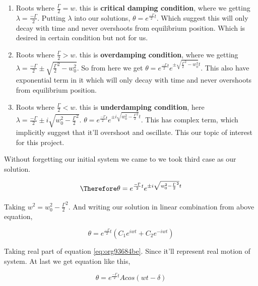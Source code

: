 \documentclass[11pt,a4paper]{article}
\begin{document}
\begin{enumerate}
\item Roots where \(\frac{\Gamma}{2}=w\). this is \textbf{critical damping condition}, where we getting \(\lambda=\frac{-\Gamma}{2}\). Putting \(\lambda\) into our solutions, \(\theta = e^{\frac{-\Gamma}{2}t}\). Which suggest this will only decay with time and never overshoots from equilibrium position. Which is desired in certain condition but not for us.

\item Roots where \(\frac{\Gamma}{2}>w\). this is \textbf{overdamping condition}, where we getting \(\lambda=\frac{-\Gamma}{2}\pm\sqrt{\frac{\Gamma}{2}^{2}-w_{0}^{2}}\). So from here we get \(\theta = e^{\frac{-\Gamma}{2}t}e^{\pm\sqrt{\frac{\Gamma}{2}^{2}-w_{0}^{2}}t}\). This also have exponential term in it which will only decay with time and never overshoots from equilibrium position.

\item Roots where \(\frac{\Gamma}{2}<w\). this is \textbf{underdamping condition}, here  \(\lambda=\frac{-\Gamma}{2}\pm i\sqrt{w_{0}^{2}-\frac{\Gamma}{2}^{2}}\). \(\theta = e^{\frac{-\Gamma}{2}t}e^{\pm i \sqrt{w_{0}^{2}-\frac{\Gamma}{2}^{2}}t}\). This has complex term, which implicitly suggest that it'll overshoot and oscillate. This our topic of interest for this project.
\end{enumerate}


Without forgetting our initial system we came to we took third case as our solution.

\begin{equation*}
\label{eq:org1eea347}
\Therefore \theta = e^{\frac{-\Gamma}{2}t}e^{\pm i \sqrt{w_{0}^{2}-\frac{\Gamma}{2}^{2}}t}
\end{equation*}

Taking \(w^{2} = w_{0}^{2}-\frac{\Gamma}{2}^{2}\). And writing our solution in linear combination from above equation,

\begin{equation}
\label{eq:org93684be}
\theta = e^{\frac{-\Gamma}{2}t}(C_{1}e^{iwt}+C_{2}e^{-iwt})
\end{equation}

Taking real part of equation \ref{eq:org93684be}. Since it'll represent real motion of system. At last we get equation like this,

\begin{equation}
\label{eq:org51fa811}
\theta = e^{\frac{-\Gamma}{2}t}A cos(wt-\delta)
\end{equation}
\end{document}
